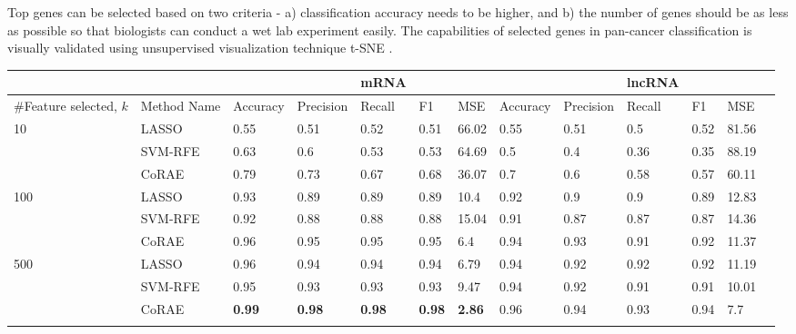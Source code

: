 \documentclass{bioinfo}
\begin{document}
Top genes can be selected based on two criteria - a) classification accuracy needs to be higher,
and b) the number of genes should be as less as possible so that biologists can conduct a wet lab experiment
easily. The capabilities of selected genes in pan-cancer classification is visually validated using unsupervised visualization technique t-SNE \citep{maaten2008visualizing}.
\begin{table}[hbt]
{\begin{tabular}{@{}ll|lllll|llllll@{}}
\toprule
& & & &mRNA&&& & &lncRNA&&& \\
\midrule
\#Feature selected, $k$ & Method Name	&	Accuracy	&	Precision	&	Recall	&	F1	& MSE &	Accuracy	&	Precision	&	Recall	&	F1	& MSE	\\
\midrule
\multirow{3}{*}{10} &	LASSO	&	0.55	&	0.51	&	0.52	&	0.51	&	66.02	&	0.55	&	0.51	&	0.5	&	0.52	&	81.56	\\
&	SVM-RFE	&	0.63	&	0.6	&	0.53	&	0.53	&	64.69	&	0.5	&	0.4	&	0.36	&	0.35	&	88.19	\\
&	CoRAE	&	0.79	&	0.73	&	0.67	&	0.68	&	36.07	&	0.7	&	0.6	&	0.58	&	0.57	&	60.11	\\
\midrule


\multirow{3}{*}{100} &	LASSO	&	0.93	&	0.89	&	0.89	&	0.89	&	10.4	&	0.92	&	0.9	&	0.9	&	0.89	&	12.83	\\
&	SVM-RFE	&	0.92	&	0.88	&	0.88	&	0.88	&	15.04	&	0.91	&	0.87	&	0.87	&	0.87	&	14.36	\\
&	CoRAE	&	0.96	&	0.95	&	0.95	&	0.95	&	6.4	&	0.94	&	0.93	&	0.91	&	0.92	&	11.37	\\

\midrule

\multirow{3}{*}{500} &	LASSO	&	0.96	&	0.94	&	0.94	&	0.94	&	6.79	&	0.94	&	0.92	&	0.92	&	0.92	&	11.19	\\
&	SVM-RFE	&	0.95	&	0.93	&	0.93	&	0.93	&	9.47	&	0.94	&	0.92	&	0.91	&	0.91	&	10.01	\\
&	CoRAE	&	\textbf{0.99}	&	\textbf{0.98}	&	\textbf{0.98	}&	\textbf{0.98}	&	\textbf{2.86}	&	0.96	&	0.94	&	0.93	&	0.94	&	7.7	\\
\botrule
\end{tabular}}{}
\end{table}
\end{document}
